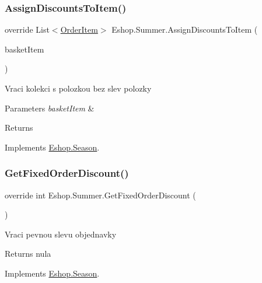 \subsubsection{\texorpdfstring{AssignDiscountsToItem()}{AssignDiscountsToItem()}}
{\footnotesize\ttfamily override List$<$\mbox{\hyperlink{class_eshop_1_1_order_item}{Order\+Item}}$>$ Eshop.\+Summer.\+Assign\+Discounts\+To\+Item (\begin{DoxyParamCaption}\item[{Key\+Value\+Pair$<$ \mbox{\hyperlink{class_eshop_1_1_product}{Product}}, int $>$}]{basket\+Item }\end{DoxyParamCaption})\hspace{0.3cm}{\ttfamily [virtual]}}



Vraci kolekci s polozkou bez slev polozky 


\begin{DoxyParams}{Parameters}
{\em basket\+Item} & \\
\hline
\end{DoxyParams}
\begin{DoxyReturn}{Returns}

\end{DoxyReturn}


Implements \mbox{\hyperlink{class_eshop_1_1_season}{Eshop.\+Season}}.

\mbox{\label{class_eshop_1_1_summer_a762d12ed77cc1dfa28b13a487fd0c0ae}} 
\subsubsection{\texorpdfstring{GetFixedOrderDiscount()}{GetFixedOrderDiscount()}}
{\footnotesize\ttfamily override int Eshop.\+Summer.\+Get\+Fixed\+Order\+Discount (\begin{DoxyParamCaption}{ }\end{DoxyParamCaption})\hspace{0.3cm}{\ttfamily [virtual]}}



Vraci pevnou slevu objednavky 

\begin{DoxyReturn}{Returns}
nula
\end{DoxyReturn}


Implements \mbox{\hyperlink{class_eshop_1_1_season}{Eshop.\+Season}}.


